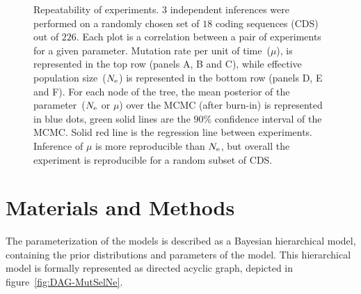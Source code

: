 \begin{figure}[htbp]
    \caption[Repeatability of experiments]{
    Repeatability of experiments.
    $3$ independent inferences were performed on a randomly chosen set of $18$ coding sequences (CDS) out of $226$.
    Each plot is a correlation between a pair of experiments for a given parameter.
    Mutation rate per unit of time~($\mu$), is represented in the top row (panels A, B and C), while effective population size~($N_{\mathrm{e}}$) is represented in the bottom row (panels D, E and F).
    For each node of the tree, the mean posterior of the parameter~($N_{\mathrm{e}}$ or $\mu$) over the \acrshort{MCMC} (after burn-in) is represented in blue dots, green solid lines are the $90\%$ confidence interval of the \acrshort{MCMC}.
    Solid red line is the regression line between experiments.
    Inference of $\mu$ is more reproducible than $N_{\mathrm{e}}$, but overall the experiment is reproducible for a random subset of CDS.
    }
    \label{fig:mammals_repeatability}
\end{figure}


\section{Materials and Methods}
\label{sec:MatMet}
The parameterization of the models is described as a Bayesian hierarchical model, containing the prior distributions and parameters of the model.
This hierarchical model is formally represented as directed acyclic graph, depicted in figure~\ref{fig:DAG-MutSelNe}.

